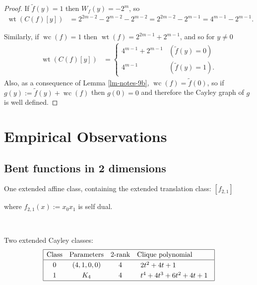 \documentclass[12pt,a4paper]{article}
\newcommand{\dual}[1]{\widetilde{#1}}
\newcommand{\weight}[1]{\operatorname{wt}\left(#1\right)}
\newcommand{\weightclass}[1]{\operatorname{wc}\left(#1\right)}
\begin{document}
\begin{proof}
If $\dual{f}(y) = 1$ then $W_f(y) = -2^m$, so
\begin{align*}
\weight{C(f)[y]}
&=
2^{2m-2}-2^{m-2} - 2^{m-2}
=
2^{2m-2} - 2^{m-1}
=
4^{m-1} - 2^{m-1}.
\end{align*}

Similarly, if $\weightclass{f} = 1$ then $\weight{f} = 2^{2m-1}+2^{m-1}$,
and so for $y \neq 0$
\begin{align*}
\weight{C(f)[y]}
&=
\begin{cases}
4^{m-1} + 2^{m-1} & (\dual{f}(y)=0)
\\
4^{m-1}           & (\dual{f}(y)=1).
\end{cases}
\end{align*}
Also, as a consequence of Lemma \ref{lm-notes-9b}, $\weightclass{f} = \dual{f}(0)$,
so if $g(y) := \dual{f}(y) + \weightclass{f}$ then $g(0)=0$ and therefore the Cayley graph of $g$
is well defined.
\end{proof}


\section{Empirical Observations}
\label{sec-Empirical}
\subsection{Bent functions in 2 dimensions}

One extended affine class, containing the extended translation class: $[f_{2,1}]$

where $f_{2,1}(x) := x_0 x_1$ is self dual.

~

Two extended Cayley classes:
\begin{align*}
\def\arraystretch{1.2}
\begin{array}{|cccl|}
\hline
\text{Class} &
\text{Parameters} &
\text{2-rank} &
\text{Clique polynomial}
\\
\hline
0 &
(4, 1, 0, 0) &
4 &
\begin{array}{l}
2t^{2} + 4t + 1
\end{array}
\\
1 &
K_4 &
4 &
\begin{array}{l}
t^{4} + 4t^{3} + 6t^{2} + 4t + 1
\end{array}
\\
\hline
\end{array}
\end{align*}
\end{document}
